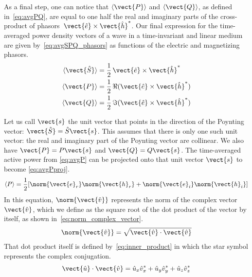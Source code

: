 As a final step, one can notice that $\langle\vect{P}\rangle$ and $\langle\vect{Q}\rangle$,
as defined in~\cref{eq:avgPQ}, are equal to one half the real and imaginary parts of the cross-product of phasors~$\vect{\hat{e}} \times \vect{\hat{h}}^*$.
Our final expression for the time-averaged power density vectors of a wave in a time-invariant and linear medium are given by~\cref{eq:avgSPQ_phasors} as functions of the electric and magnetizing phasors.
\begin{subequations}
    \begin{align}        
    \langle\vect{\hat{S}}\rangle &= \frac{1}{2}\,\vect{\hat{e}} \times \vect{\hat{h}}^*
    \\
    \langle\vect{P}\rangle       &= \frac{1}{2}\,\Re(\vect{\hat{e}} \times \vect{\hat{h}}^*)
    \\
    \langle\vect{Q}\rangle       &= \frac{1}{2}\,\Im(\vect{\hat{e}} \times \vect{\hat{h}}^*)
    \end{align}
    \label{eq:avgSPQ_phasors}
\end{subequations}

Let us call $\vect{s}$ the unit vector that points in the direction of the Poynting vector: $\vect{\hat{S}} = \hat{S} \vect{s}$.
This assumes that there is only one such unit vector: the real and imaginary part of the Poynting vector are collinear.
We also have $\vect{P} = P \vect{s}$
and $\vect{Q} = Q \vect{s}$.
The time-averaged active power from \cref{eq:avgP} can be projected onto that unit vector $\vect{s}$ to become \cref{eq:avgPproj}.
\begin{equation}
    \langle P \rangle
    = \frac{1}{2}
    [
        \norm{\vect{e}_r} \norm{\vect{h}_r}
        +
        \norm{\vect{e}_i} \norm{\vect{h}_i}
    ]
    \label{eq:avgPproj}
\end{equation}
In this equation, $\norm{\vect{\hat{v}}}$ represents the norm of the complex vector $\vect{\hat{v}}$, which we define as the square root of the dot product of the vector by itself, as shown in~\cref{eq:norm_complex_vector}.
\begin{equation}
    \norm{\vect{\hat{v}}}
    =
    \sqrt{\vect{\hat{v}} \cdot \vect{\hat{v}}}
    \label{eq:norm_complex_vector}
\end{equation}
That dot product itself is defined by~\cref{eq:inner_product} in which the star symbol represents the complex conjugation.
\begin{equation}   
    \vect{\hat{u}} \cdot \vect{\hat{v}} = \hat{u}_x \hat{v}_x^* + \hat{u}_y \hat{v}_y^* + \hat{u}_z \hat{v}_z^*
    \label{eq:inner_product}
\end{equation}

